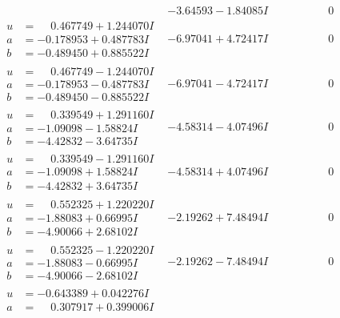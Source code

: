 \documentclass[1p]{elsarticle_modified}
\theoremstyle{definition}
\begin{document}
$$\begin{array}{c|c|c}
 & -3.64593 - 1.84085 I & \phantom{-0.000000 } 0 \\ \hline\begin{aligned}
u &= \phantom{-}0.467749 + 1.244070 I \\
a &= -0.178953 + 0.487783 I \\
b &= -0.489450 + 0.885522 I\end{aligned}
 & -6.97041 + 4.72417 I & \phantom{-0.000000 } 0 \\ \hline\begin{aligned}
u &= \phantom{-}0.467749 - 1.244070 I \\
a &= -0.178953 - 0.487783 I \\
b &= -0.489450 - 0.885522 I\end{aligned}
 & -6.97041 - 4.72417 I & \phantom{-0.000000 } 0 \\ \hline\begin{aligned}
u &= \phantom{-}0.339549 + 1.291160 I \\
a &= -1.09098 - 1.58824 I \\
b &= -4.42832 - 3.64735 I\end{aligned}
 & -4.58314 - 4.07496 I & \phantom{-0.000000 } 0 \\ \hline\begin{aligned}
u &= \phantom{-}0.339549 - 1.291160 I \\
a &= -1.09098 + 1.58824 I \\
b &= -4.42832 + 3.64735 I\end{aligned}
 & -4.58314 + 4.07496 I & \phantom{-0.000000 } 0 \\ \hline\begin{aligned}
u &= \phantom{-}0.552325 + 1.220220 I \\
a &= -1.88083 + 0.66995 I \\
b &= -4.90066 + 2.68102 I\end{aligned}
 & -2.19262 + 7.48494 I & \phantom{-0.000000 } 0 \\ \hline\begin{aligned}
u &= \phantom{-}0.552325 - 1.220220 I \\
a &= -1.88083 - 0.66995 I \\
b &= -4.90066 - 2.68102 I\end{aligned}
 & -2.19262 - 7.48494 I & \phantom{-0.000000 } 0 \\ \hline\begin{aligned}
u &= -0.643389 + 0.042276 I \\
a &= \phantom{-}0.307917 + 0.399006 I \\

\end{aligned}
\end{array}$$
\end{document}
